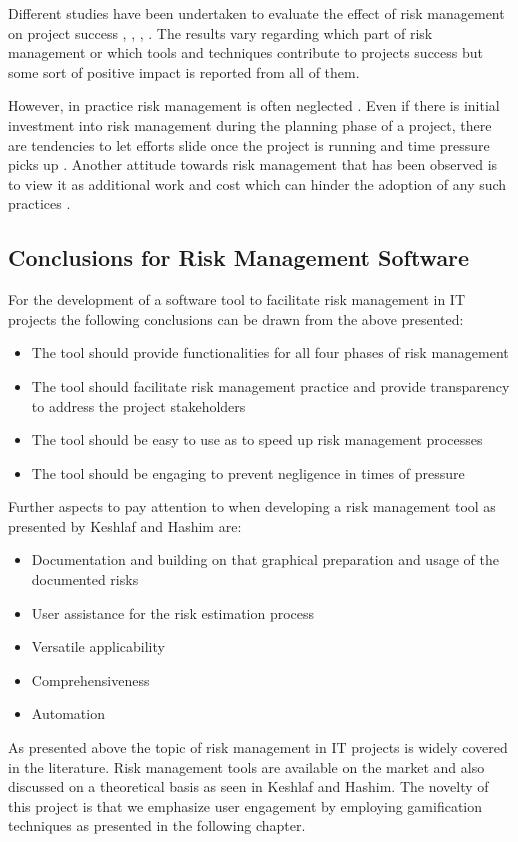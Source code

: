 Different studies have been undertaken to evaluate the effect of risk management on project success \cite{debakkerDoesRiskManagement2010}, \cite{didragaRoleEffectsRisk2013}, \cite{kwakProjectRiskManagement2004}, \cite{juniorUnderstandingImpactProject2013}. The results vary regarding which part of risk management or which tools and techniques contribute to projects success but some sort of positive impact is reported from all of them.

However, in practice risk management is often neglected \cite{kwakProjectRiskManagement2004}. Even if there is initial investment into risk management during the planning phase of a project, there are tendencies to let efforts slide once the project is running and time pressure picks up \cite{peixotoProjectRiskManagement2014}. Another attitude towards risk management that has been observed is to view it as additional work and cost which can hinder the adoption of any such practices \cite{teschITProjectRisk2007}.

\subsection{Conclusions for Risk Management Software}
\label{sec:theoryAd}
For the development of a software tool to facilitate risk management in IT projects the following conclusions can be drawn from the above presented:
\begin{itemize}
	\item The tool should provide functionalities for all four phases of risk management
	\item The tool should facilitate risk management practice and provide transparency to address the project stakeholders
	\item The tool should be easy to use as to speed up risk management processes
	\item The tool should be engaging to prevent negligence in times of pressure	
\end{itemize}
Further aspects to pay attention to when developing a risk management tool as presented by Keshlaf and Hashim \cite{keshlafModelPrototypeTool2000} are:
\begin{itemize}
	\item	Documentation and building on that graphical preparation and usage of the documented risks
	\item	User assistance for the risk estimation process
	\item	Versatile applicability
	\item	Comprehensiveness
	\item	Automation	
\end{itemize}

As presented above the topic of risk management in IT projects is widely covered in the literature. Risk management tools are available on the market and also discussed on a theoretical basis as seen in Keshlaf and Hashim. The novelty of this project is that we emphasize user engagement by employing gamification techniques as presented in the following chapter.